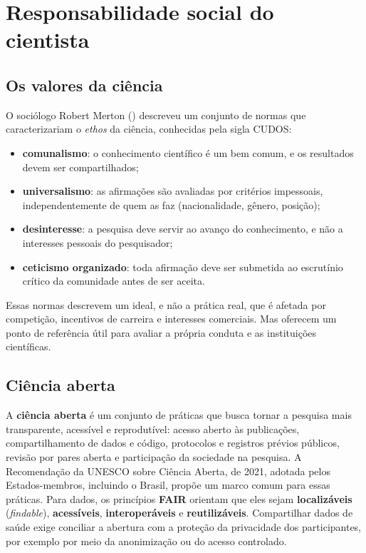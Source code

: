 \documentclass[
]{book}
\providecommand{\tightlist}{%
  \setlength{\itemsep}{0pt}\setlength{\parskip}{0pt}}
\begin{document}
\section{Responsabilidade social do cientista}\label{responsabilidade-social-do-cientista}

\subsection{Os valores da ciência}\label{os-valores-da-ciuxeancia}

O sociólogo Robert Merton () descreveu um conjunto de normas que caracterizariam o \emph{ethos} da ciência, conhecidas pela sigla CUDOS:

\begin{itemize}
\tightlist
\item
  \textbf{comunalismo}: o conhecimento científico é um bem comum, e os resultados devem ser compartilhados;
\item
  \textbf{universalismo}: as afirmações são avaliadas por critérios impessoais, independentemente de quem as faz (nacionalidade, gênero, posição);
\item
  \textbf{desinteresse}: a pesquisa deve servir ao avanço do conhecimento, e não a interesses pessoais do pesquisador;
\item
  \textbf{ceticismo organizado}: toda afirmação deve ser submetida ao escrutínio crítico da comunidade antes de ser aceita.
\end{itemize}

Essas normas descrevem um ideal, e não a prática real, que é afetada por competição, incentivos de carreira e interesses comerciais. Mas oferecem um ponto de referência útil para avaliar a própria conduta e as instituições científicas.

\subsection{Ciência aberta}\label{ciuxeancia-aberta}

A \textbf{ciência aberta} é um conjunto de práticas que busca tornar a pesquisa mais transparente, acessível e reprodutível: acesso aberto às publicações, compartilhamento de dados e código, protocolos e registros prévios públicos, revisão por pares aberta e participação da sociedade na pesquisa. A Recomendação da UNESCO sobre Ciência Aberta, de 2021, adotada pelos Estados-membros, incluindo o Brasil, propõe um marco comum para essas práticas. Para dados, os princípios \textbf{FAIR} orientam que eles sejam \textbf{localizáveis} (\emph{findable}), \textbf{acessíveis}, \textbf{interoperáveis} e \textbf{reutilizáveis}. Compartilhar dados de saúde exige conciliar a abertura com a proteção da privacidade dos participantes, por exemplo por meio da anonimização ou do acesso controlado.
\end{document}

